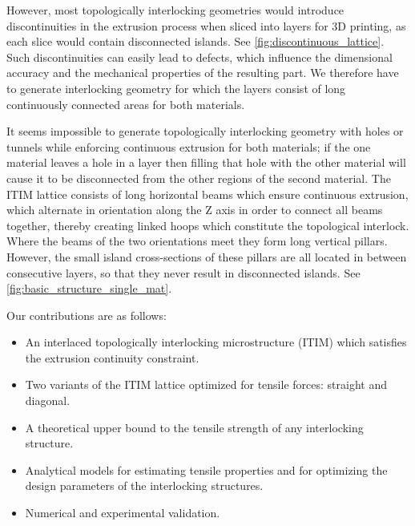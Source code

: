 However, most topologically interlocking geometries would introduce discontinuities in the extrusion process when sliced into layers for 3D printing, as each slice would contain disconnected islands.
See \cref{fig:discontinuous_lattice}.
Such discontinuities can easily lead to defects, which influence the dimensional accuracy and the mechanical properties of the resulting part.
We therefore have to generate interlocking geometry for which the layers consist of long continuously connected areas for both materials.

It seems impossible to generate topologically interlocking geometry with holes or tunnels while enforcing continuous extrusion for both materials;
if the one material leaves a hole in a layer then filling that hole with the other material will cause it to be disconnected from the other regions of the second material.
The ITIM lattice consists of long horizontal beams which ensure continuous extrusion, which alternate in orientation along the Z axis in order to connect all beams together, thereby creating linked hoops which constitute the topological interlock.
Where the beams of the two orientations meet they form long vertical pillars. %
However, the small island cross-sections of these pillars are all located in between consecutive layers, so that they never result in disconnected islands.
See \cref{fig:basic_structure_single_mat}.


Our contributions are as follows:
\begin{itemize}
	\item An interlaced topologically interlocking microstructure (ITIM) which satisfies the extrusion continuity constraint.
	\item Two variants of the ITIM lattice optimized for tensile forces: straight and diagonal.
	\item A theoretical upper bound to the tensile strength of any interlocking structure.
	\item Analytical models for estimating tensile properties and for optimizing the design parameters of the interlocking structures.
	\item Numerical and experimental validation.
\end{itemize}







